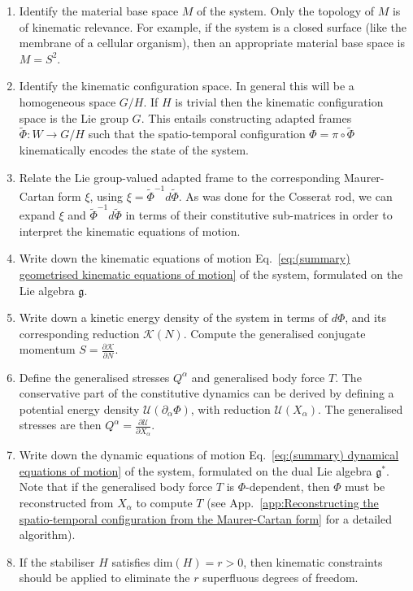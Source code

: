 \begin{enumerate}

\item Identify the material base space $M$ of the system. Only the topology of $M$ is of kinematic relevance. For example, if the system is a closed surface (like the membrane of a cellular organism), then an appropriate material base space is $M = S^2$.

\item Identify the kinematic configuration space. In general this will be a homogeneous space $G/H$. If $H$ is trivial then the kinematic configuration space is the Lie group $G$. This entails constructing adapted frames $\tilde{\Phi} : W \to G/H$ such that the spatio-temporal configuration $\Phi = \pi \circ \tilde{\Phi}$ kinematically encodes the state of the system. 

\item Relate the Lie group-valued adapted frame to the corresponding Maurer-Cartan form $\xi$, using $\xi = \tilde{\Phi}^{-1} d \tilde{\Phi}$. As was done for the Cosserat rod, we can expand $\xi$  and $\tilde{\Phi}^{-1} d \tilde{\Phi}$ in terms of their constitutive sub-matrices in order to interpret the kinematic equations of motion.

\item Write down the kinematic equations of motion Eq.~\ref{eq:(summary) geometrised kinematic equations of motion} of the system, formulated on the Lie algebra $\mathfrak{g}$.

\item Write down a kinetic energy density of the system in terms of $d \Phi$, and its corresponding reduction $\mathcal{K}(N)$. Compute the generalised conjugate momentum $S = \frac{\partial \mathcal{K}}{\partial N}$.

\item Define the generalised stresses $Q^\alpha$ and generalised body force $T$. The conservative  part of the constitutive dynamics can be derived by defining a potential energy density $\mathcal{U}(\partial_\alpha \Phi)$, with reduction $\mathcal{U}(X_\alpha)$. The generalised stresses are then $Q^\alpha = \frac{\partial \mathcal{U}}{\partial X_\alpha}$.

\item Write down the dynamic equations of motion Eq.~\ref{eq:(summary) dynamical equations of motion} of the system, formulated on the dual Lie algebra $\mathfrak{g}^*$. Note that if the generalised body force $T$ is $\Phi$-dependent, then $\Phi$ must be reconstructed from $X_\alpha$ to compute $T$ (see App.~\ref{app:Reconstructing the spatio-temporal configuration from the Maurer-Cartan form} for a detailed algorithm).

\item If the stabiliser $H$ satisfies $\text{dim}(H) = r > 0$, then kinematic constraints should be applied to eliminate the $r$ superfluous degrees of freedom.

\end{enumerate}

